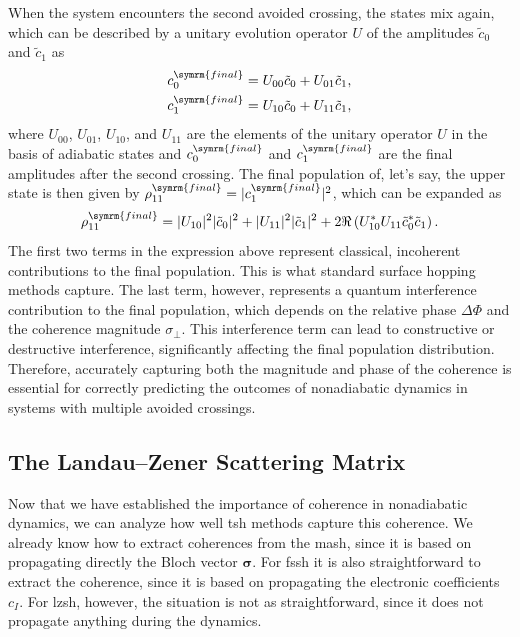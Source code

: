 When the system encounters the second avoided crossing, the states mix again, which can be described by a unitary evolution operator $U$ of the amplitudes $\tilde c_0$ and $\tilde c_1$ as
\begin{align}
c_0^{\symrm{final}}&=U_{00}\tilde c_0+U_{01}\tilde c_1,\\
c_1^{\symrm{final}}&=U_{10}\tilde c_0+U_{11}\tilde c_1,
\end{align}
where $U_{00}$, $U_{01}$, $U_{10}$, and $U_{11}$ are the elements of the unitary operator $U$ in the basis of adiabatic states and $c_0^{\symrm{final}}$ and $c_1^{\symrm{final}}$ are the final amplitudes after the second crossing. The final population of, let's say, the upper state is then given by $\rho_{11}^{\symrm{final}}=|c_1^{\symrm{final}}|^2$, which can be expanded as
\begin{equation}
\rho_{11}^{\symrm{final}}=|U_{10}|^2|\tilde c_0|^2+|U_{11}|^2|\tilde c_1|^2+2\Re\left(U_{10}^*U_{11}\tilde c_0^\ast\tilde c_1\right).
\end{equation}
The first two terms in the expression above represent classical, incoherent contributions to the final population. This is what standard surface hopping methods capture. The last term, however, represents a quantum interference contribution to the final population, which depends on the relative phase $\Delta\Phi$ and the coherence magnitude $\sigma_\perp$. This interference term can lead to constructive or destructive interference, significantly affecting the final population distribution. Therefore, accurately capturing both the magnitude and phase of the coherence is essential for correctly predicting the outcomes of nonadiabatic dynamics in systems with multiple avoided crossings.
\subsection{The Landau--Zener Scattering Matrix}
Now that we have established the importance of coherence in nonadiabatic dynamics, we can analyze how well \acrshort{tsh} methods capture this coherence. We already know how to extract coherences from the \acrshort{mash}, since it is based on propagating directly the Bloch vector $\symbf{\sigma}$. For \acrshort{fssh} it is also straightforward to extract the coherence, since it is based on propagating the electronic coefficients $c_I$. For \acrshort{lzsh}, however, the situation is not as straightforward, since it does not propagate anything during the dynamics.

